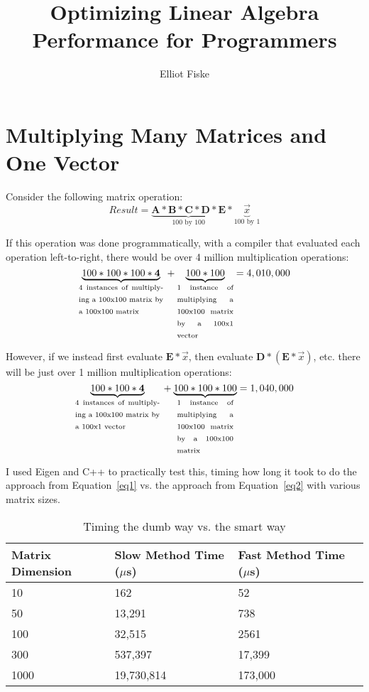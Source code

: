 \documentclass[report,12pt,notitlepage,onecolumn]{article}
\author{Elliot Fiske}
\title{Optimizing Linear Algebra Performance for Programmers}
\begin{document}
\maketitle

\newcommand{\matr}[1]{\mathbf{#1}} %

\section{Multiplying Many Matrices and One Vector}
Consider the following matrix operation:
\begin{equation}
Result = \underbrace{\matr{A} * \matr{B} * \matr{C} * \matr{D} * \matr{E}}
_\text{100 by 100}{} * \underbrace{\vec{x}}
_\text{100 by 1}
\end{equation}

If this operation was done programmatically, with a compiler that evaluated each operation left-to-right, there would be over 4 million multiplication operations: \begin{equation}\label{eq1}
\underbrace{100 * 100 * 100 * \textbf{4}}_\text{\parbox{3cm}{4 instances of multiplying a 100x100 matrix by a 100x100 matrix}}{} + \underbrace{100 * 100}_\text{\parbox{2cm}{1 instance of multiplying a 100x100 matrix by a 100x1 vector}} = 4,010,000
\end{equation}

However, if we instead first evaluate $\matr{E}{} * \vec{x}$, then evaluate $\matr{D}{} * (\matr{E}{} * \vec{x})$, etc. there will be just over 1 million multiplication operations: 
\begin{equation}\label{eq2}
\underbrace{100 * 100 * \textbf{4}}_\text{\parbox{3cm}{4 instances of multiplying a 100x100 matrix by a 100x1 vector}}{} + \underbrace{100 * 100 * 100}_\text{\parbox{2cm}{1 instance of multiplying a 100x100 matrix by a 100x100 matrix}} = 1,040,000
\end{equation}

I used Eigen and C++ to practically test this, timing how long it took to do the approach from Equation~\ref{eq1} vs. the approach from Equation~\ref{eq2} with various matrix sizes.

\begin{table}[!h]
	\begin{tabular}{| l | l | l | l |}
		\hline
		Matrix Dimension & Slow Method Time ($\mu$s) & Fast Method Time ($\mu$s) \\ \hline
		10 & 162 & 52 \\ \hline
		50 & 13,291 & 738  \\ \hline
		100 & 32,515 & 2561  \\ \hline
		300 & 537,397 & 17,399  \\ \hline
		1000 & 19,730,814 & 173,000  \\
		\hline
	\end{tabular}
	\caption{Timing the dumb way vs. the smart way\label{data1}}
\end{table}
\end{document}
